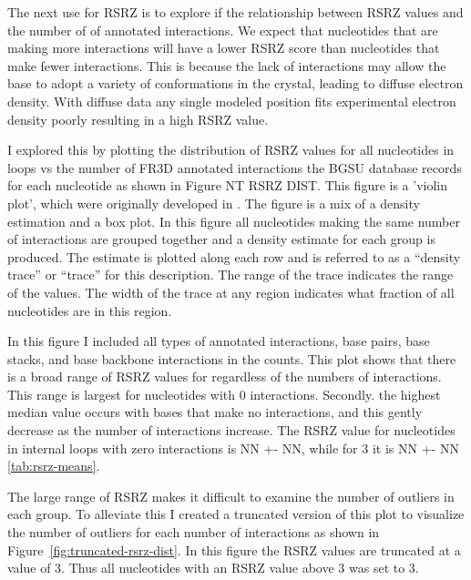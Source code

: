 The next use for RSRZ is to explore if the relationship between RSRZ values and
the number of of annotated interactions. We expect that nucleotides that are
making more interactions will have a lower RSRZ score than nucleotides that make
fewer interactions. This is because the lack of interactions may allow the base
to adopt a variety of conformations in the crystal, leading to diffuse electron
density. With diffuse data any single modeled position fits experimental
electron density poorly resulting in a high RSRZ value.

I explored this by plotting the distribution of RSRZ values for all nucleotides
in loops vs the number of FR3D annotated interactions the BGSU database records
for each nucleotide as shown in Figure NT RSRZ DIST. This figure is a 'violin
plot', which were originally developed in \cite{Hintze1998}. The figure is a mix
of a density estimation and a box plot. In this figure all nucleotides making
the same number of interactions are grouped together and a density estimate for
each group is produced. The estimate is plotted along each row and is referred
to as a ``density trace'' or ``trace'' for this description. The range of the
trace indicates the range of the values. The width of the trace at any region
indicates what fraction of all nucleotides are in this region.

In this figure I included all types of annotated interactions, base pairs, base
stacks, and base backbone interactions in the counts. This plot shows that there
is a broad range of RSRZ values for regardless of the numbers of interactions.
This range is largest for nucleotides with 0 interactions.  Secondly. the
highest median value occurs with bases that make no interactions, and this
gently decrease as the number of interactions increase. The RSRZ value for
nucleotides in internal loops with zero interactions is NN +- NN, while for 3 it
is NN +- NN \ref{tab:rsrz-means}.

The large range of RSRZ makes it difficult to examine the number of outliers in
each group. To alleviate this I created a truncated version of this plot to
visualize the number of outliers for each number of interactions as shown in
Figure~\ref{fig:truncated-rsrz-dist}. In this figure the RSRZ values are
truncated at a value of 3. Thus all nucleotides with an RSRZ value above 3 was
set to 3.


